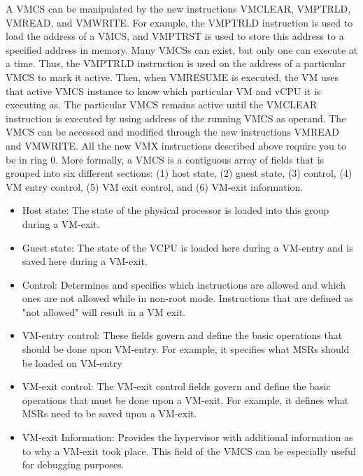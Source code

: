 \documentclass{report}
\begin{document}
\begin{spacing}{1.5}
{\large
\noindent A VMCS can be manipulated by the new instructions VMCLEAR, VMPTRLD, VMREAD, and VMWRITE. For example, the VMPTRLD instruction is used to load the address of a VMCS, and VMPTRST is used to store this address to a specified address in memory. Many VMCSs can exist, but only one can execute at a time. Thus, the VMPTRLD instruction is used on the address of a particular VMCS to mark it active. Then, when VMRESUME is executed, the VM uses that active VMCS instance to know which particular VM and vCPU it is executing as. The particular VMCS remains active until the VMCLEAR instruction is executed by using address of the running VMCS as operand. The VMCS can be accessed and modified through the new instructions VMREAD and VMWRITE. All the new VMX instructions described above require you to be in ring 0. More formally, a VMCS is a contiguous array of fields that is grouped into six different sections: (1) host state, (2) guest state, (3) control, (4) VM entry control, (5) VM exit control, and (6) VM-exit information.
\newline
}

{\large
\begin{itemize}
    \item Host state: The state of the physical processor is loaded into this group during a VM-exit.

    \item Guest state: The state of the VCPU is loaded here during a VM-entry and is saved here during a VM-exit.

    \item Control: Determines and specifies which instructions are allowed and which ones are not allowed while in non-root mode. Instructions that are defined as "not allowed" will result in a VM exit.

    \item VM-entry control: These fields govern and define the basic operations that should be done upon VM-entry. For example, it specifies what MSRs should be loaded on VM-entry

    \item VM-exit control: The VM-exit control fields govern and define the basic operations that must be done upon a VM-exit. For example, it defines what MSRs need to be saved upon a VM-exit.

    \item VM-exit Information: Provides the hypervisor with additional information as to why a VM-exit took place. This field of the VMCS can be especially useful for debugging purposes.
    \newline
\end{itemize}
}







\end{spacing}
\end{document}
